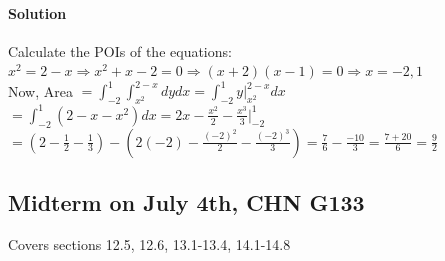 \documentclass{article}
\newcommand{\Int}[2]{\int_{#1}^{#2}}
\newcommand{\eval}[2]{\bigg|_{#1}^{#2}}
\begin{document}
\paragraph{Solution} Calculate the POIs of the equations: $x^2=2-x\Rightarrow x^2+x-2=0\Rightarrow (x+2)(x-1)=0\Rightarrow x=-2,1$
\\Now, Area $=\Int{-2}{1}\Int{x^2}{2-x}dydx=\Int{-2}{1}y\eval{x^2}{2-x}dx$
\\$=\Int{-2}{1}(2-x-x^2)dx=2x-\frac{x^2}{2}-\frac{x^3}{3}\eval{-2}{1}$
\\$=(2-\frac{1}{2}-\frac{1}{3})-(2(-2)-\frac{(-2)^2}{2}-\frac{(-2)^3}{3})=\frac{7}{6}-\frac{-10}{3}=\frac{7+20}{6}=\frac{9}{2}$

\subsection{Midterm on July 4th, CHN G133}
Covers sections 12.5, 12.6, 13.1-13.4, 14.1-14.8
\end{document}
